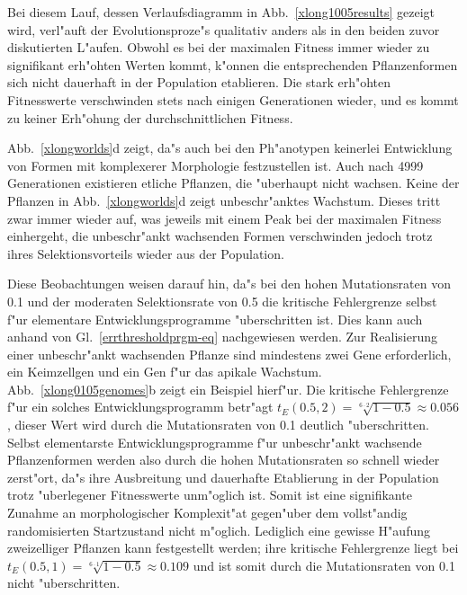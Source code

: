 Bei diesem Lauf, dessen Verlaufsdiagramm in Abb.\ \ref{xlong1005results}
gezeigt wird, verl"auft der Evolutionsproze"s qualitativ anders als in den beiden zuvor diskutierten
L"aufen. Obwohl es bei der maximalen Fitness immer wieder zu signifikant erh"ohten Werten kommt, k"onnen
die entsprechenden Pflanzenformen sich nicht dauerhaft in der Population etablieren. Die stark erh"ohten
Fitnesswerte verschwinden stets nach einigen Generationen wieder, und es kommt zu keiner Erh"ohung der
durchschnittlichen Fitness.

Abb.\ \ref{xlongworlds}d zeigt, da"s auch bei den Ph"anotypen keinerlei Entwicklung von Formen mit komplexerer
Morphologie festzustellen ist. Auch nach 4999 Generationen existieren etliche Pflanzen, die "uberhaupt nicht
wachsen. Keine der Pflanzen in Abb.\ \ref{xlongworlds}d zeigt unbeschr"anktes Wachstum. Dieses tritt zwar
immer wieder auf, was jeweils mit einem Peak bei der maximalen Fitness
einhergeht, die unbeschr"ankt wachsenden Formen verschwinden jedoch trotz ihres Selektionsvorteils wieder
aus der Population.

Diese Beobachtungen weisen darauf hin, da"s 
bei den hohen Mutationsraten von 0.1 und der moderaten Selektionsrate von 0.5 
die kritische Fehlergrenze selbst f"ur elementare Entwicklungsprogramme "uberschritten ist.
Dies kann auch anhand von Gl.\ \ref{errthresholdprgm-eq} nachgewiesen werden.
Zur Realisierung einer unbeschr"ankt
wachsenden Pflanze sind mindestens zwei Gene erforderlich, ein Keimzellgen und ein Gen f"ur das apikale
Wachstum. Abb.\ \ref{xlong0105genomes}b zeigt ein Beispiel hierf"ur. Die kritische Fehlergrenze f"ur ein solches
Entwicklungsprogramm betr"agt $t_E(0.5,2) = \sqrt[6 \cdot 2]{1-0.5} \approx 0.056$, dieser Wert wird durch die Mutationsraten
von 0.1 deutlich "uberschritten.
Selbst elementarste Entwicklungsprogramme
f"ur unbeschr"ankt wachsende Pflanzenformen werden also durch die hohen Mutationsraten so schnell wieder zerst"ort,
da"s ihre Ausbreitung und dauerhafte Etablierung in der Population trotz "uberlegener Fitnesswerte unm"oglich
ist. Somit ist eine signifikante Zunahme an morphologischer Komplexit"at gegen"uber dem
vollst"andig randomisierten Startzustand nicht m"oglich. Lediglich eine gewisse H"aufung zweizelliger Pflanzen
kann festgestellt werden; ihre kritische Fehlergrenze liegt bei $t_E(0.5,1) = \sqrt[6 \cdot 1]{1-0.5} \approx 0.109$ und ist
somit durch die Mutationsraten von 0.1 nicht "uberschritten.


